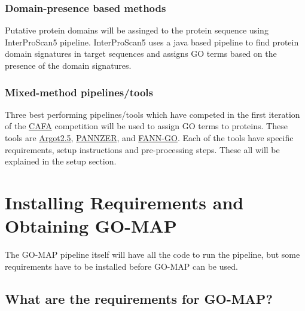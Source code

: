 \documentclass[11pt,letterpaper]{article}
\begin{document}
\subsubsection{Domain-presence based methods}
Putative protein domains will be assinged to the protein sequence using InterProScan5 pipeline. InterProScan5 uses a java based pipeline to find protein domain signatures in target sequences and assigns GO terms based on the presence of the domain signatures.

\subsubsection{Mixed-method pipelines/tools}
Three best performing pipelines/tools which have competed in the first iteration of the \href{http://biofunctionprediction.org}{CAFA} competition will be used to assign GO terms to proteins. These tools are \href{http://www.medcomp.medicina.unipd.it/Argot2-5/}{Argot2.5}, \href{http://ekhidna.biocenter.helsinki.fi/pannzer}{PANNZER}, and \href{http://montana.informatics.indiana.edu/fanngo/fanngo.html}{FANN-GO}. Each of the tools have specific requirements, setup instructions and pre-processing steps. These all will be explained in the setup section.



\section{Installing Requirements and Obtaining GO-MAP}
The GO-MAP pipeline itself will have all the code to run the pipeline, but some requirements have to be installed before GO-MAP can be used. \\[0.3cm]

\subsection{What are the requirements for GO-MAP?}
\end{document}
